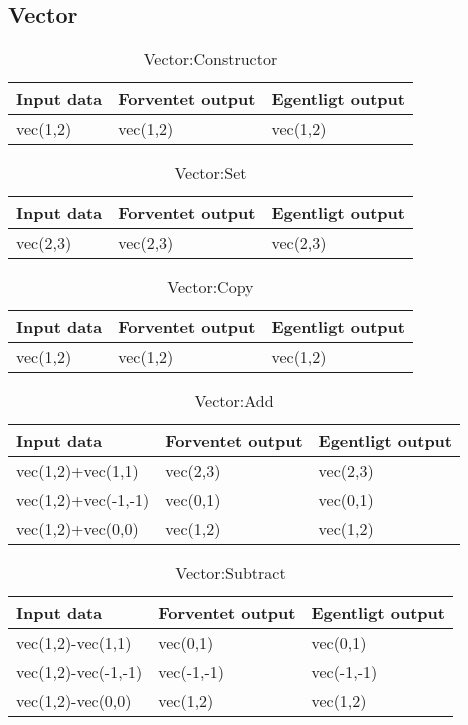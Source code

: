 
\subsection{Vector}

\begin{table}[ht]
	\caption{Vector:Constructor}
	\centering
	\begin{tabular}{L L L}
		\hline\hline
		Input data & Forventet output & Egentligt output \\ [0.5ex]
		\hline
		vec(1,2) & vec(1,2) & vec(1,2) \\
		\hline
	\end{tabular}
\end{table}

\begin{table}[ht]
	\caption{Vector:Set}
	\centering
	\begin{tabular}{L L L}
		\hline\hline
		Input data & Forventet output & Egentligt output \\ [0.5ex]
		\hline
		vec(2,3) & vec(2,3) & vec(2,3) \\
		\hline
	\end{tabular}
\end{table}

\begin{table}[ht]
	\caption{Vector:Copy}
	\centering
	\begin{tabular}{L L L}
		\hline\hline
		Input data & Forventet output & Egentligt output \\ [0.5ex]
		\hline
		vec(1,2) & vec(1,2) & vec(1,2) \\
		\hline
	\end{tabular}
\end{table}

\begin{table}[ht]
	\caption{Vector:Add}
	\centering
	\begin{tabular}{L L L}
		\hline\hline
		Input data & Forventet output & Egentligt output \\ [0.5ex]
		\hline
		vec(1,2)+vec(1,1) & vec(2,3) & vec(2,3)\\
		vec(1,2)+vec(-1,-1) & vec(0,1) & vec(0,1)\\
		vec(1,2)+vec(0,0) & vec(1,2) & vec(1,2)\\
		\hline
	\end{tabular}
\end{table}

\begin{table}[ht]
	\caption{Vector:Subtract}
	\centering
	\begin{tabular}{L L L}
		\hline\hline
		Input data & Forventet output & Egentligt output \\ [0.5ex]
		\hline
		vec(1,2)-vec(1,1) & vec(0,1) & vec(0,1)\\
		vec(1,2)-vec(-1,-1) & vec(-1,-1) & vec(-1,-1)\\
		vec(1,2)-vec(0,0) & vec(1,2) & vec(1,2)\\
		\hline
	\end{tabular}
\end{table}

